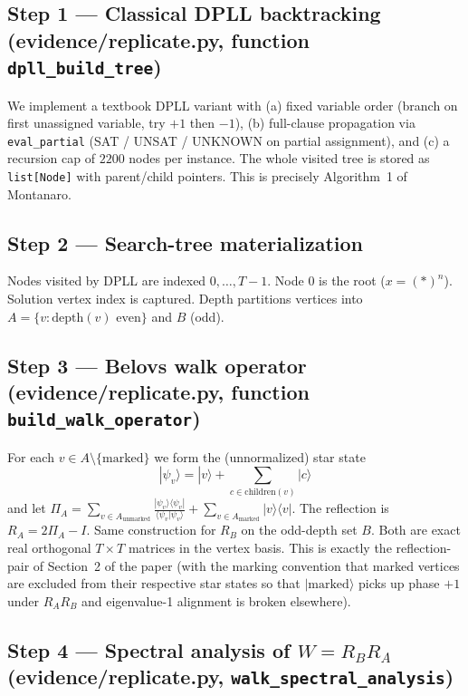 \documentclass[11pt]{article}
\begin{document}
\subsection{Step 1 --- Classical DPLL backtracking (evidence/replicate.py, function
\texttt{dpll\_build\_tree})}

We implement a textbook DPLL variant with (a) fixed variable order (branch on
first unassigned variable, try $+1$ then $-1$), (b) full-clause propagation via
\texttt{eval\_partial} (SAT / UNSAT / UNKNOWN on partial assignment), and (c) a
recursion cap of $2200$ nodes per instance. The whole visited tree is stored
as \texttt{list[Node]} with parent/child pointers. This is precisely
Algorithm~1 of Montanaro.

\subsection{Step 2 --- Search-tree materialization}

Nodes visited by DPLL are indexed $0,\ldots,T-1$. Node 0 is the root
($x=(*)^{n}$). Solution vertex index is captured. Depth partitions vertices
into $A = \{v : \mathrm{depth}(v) \text{ even}\}$ and $B$ (odd).

\subsection{Step 3 --- Belovs walk operator (evidence/replicate.py, function
\texttt{build\_walk\_operator})}

For each $v \in A \setminus \{\mathrm{marked}\}$ we form the (unnormalized)
star state
\[
|\psi_v\rangle = |v\rangle + \sum_{c \in \mathrm{children}(v)} |c\rangle
\]
and let $\Pi_A = \sum_{v \in A_{\mathrm{unmarked}}} \frac{|\psi_v\rangle\langle\psi_v|}{\langle\psi_v|\psi_v\rangle}
 + \sum_{v \in A_{\mathrm{marked}}} |v\rangle\langle v|$.
The reflection is $R_A = 2\Pi_A - I$. Same construction for $R_B$ on the
odd-depth set $B$. Both are exact real orthogonal $T\times T$ matrices in the
vertex basis. This is exactly the reflection-pair of Section~2 of the paper
(with the marking convention that marked vertices are excluded from their
respective star states so that $|\mathrm{marked}\rangle$ picks up phase $+1$
under $R_A R_B$ and eigenvalue-1 alignment is broken elsewhere).

\subsection{Step 4 --- Spectral analysis of $W=R_B R_A$
(evidence/replicate.py, \texttt{walk\_spectral\_analysis})}
\end{document}
